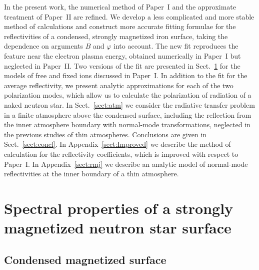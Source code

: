 \documentclass{aa}
\begin{document}
In the present work,  the numerical method of Paper~I and
the approximate treatment of Paper~II are refined.  We
develop a less complicated and more stable method of
calculations and construct more accurate fitting formulae
for the reflectivities of a condensed, strongly magnetized
iron surface, taking the dependence on arguments $B$ and
$\varphi$ into account. The new fit reproduces the feature
near the electron plasma energy, obtained numerically in
Paper~I but neglected in Paper~II. Two versions of the fit
are presented in Sect.~\ref{sect:refl} for the models of
free and fixed ions discussed in Paper~I. In addition to the
fit for the average reflectivity, we present analytic
approximations for each of the two polarization modes, which
allow us to calculate the polarization of radiation of a
naked neutron star. In Sect.~\ref{sect:atm} we consider the
radiative transfer problem in a finite atmosphere above the
condensed surface, including the reflection from the inner
atmosphere boundary with normal-mode transformations,
neglected in the previous studies of thin atmospheres.
Conclusions are given in Sect.~\ref{sect:concl}. In
Appendix~\ref{sect:Improved} we describe the method of
calculation for the reflectivity coefficients, which is
improved with respect to Paper~I. In Appendix~\ref{sect:rmj}
we describe an analytic model of normal-mode reflectivities
at the inner boundary of a thin atmosphere.

\section{Spectral properties of
a strongly magnetized neutron star surface} 
\label{sect:refl}

\subsection{Condensed magnetized surface}
\label{sect:surface}
\end{document}

